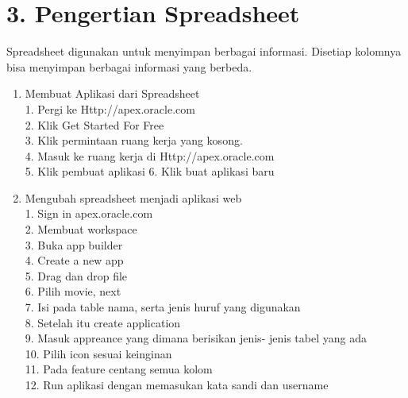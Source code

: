 \section*{\normalsize 3. Pengertian Spreadsheet}
\hspace{\parindent}Spreadsheet digunakan untuk menyimpan berbagai informasi. Disetiap kolomnya bisa menyimpan berbagai informasi yang berbeda.
\begin{enumerate}[label=\alph*.]
\item Membuat Aplikasi dari Spreadsheet\\
	1. Pergi ke Http://apex.oracle.com\\
	2. Klik Get Started For Free\\
	3. Klik permintaan ruang kerja yang kosong.\\
	4. Masuk ke ruang kerja di Http://apex.oracle.com\\
	5. Klik pembuat aplikasi 
	6. Klik buat aplikasi baru\\

\item Mengubah spreadsheet menjadi aplikasi web\\
	1. Sign in apex.oracle.com\\
	2. Membuat workspace\\
	3. Buka app builder\\ 
	4. Create a new app\\ 
	5. Drag dan drop ﬁle\\
	6. Pilih movie, next\\
	7. Isi pada table nama, serta jenis huruf yang digunakan\\
	8. Setelah itu create application\\
	9. Masuk appreance yang dimana berisikan jenis- jenis tabel yang ada\\
	10. Pilih icon sesuai 	keinginan\\ 
	11. Pada feature centang semua kolom\\
	12. Run aplikasi dengan memasukan kata sandi dan username\\
\end{enumerate}

